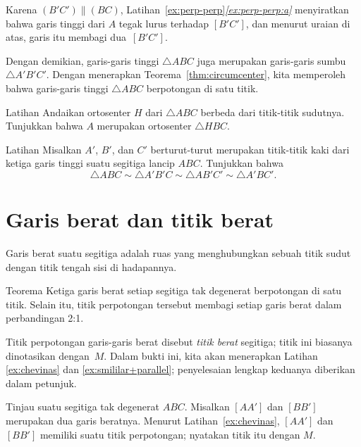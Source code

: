 Karena $(B' C')\parallel (BC)$, Latihan~\ref{ex:perp-perp}\textit{\ref{ex:perp-perp:a}} menyiratkan bahwa garis tinggi dari $A$ tegak lurus terhadap $[B' C']$, dan menurut uraian di atas, garis itu membagi dua~$[B' C']$.

Dengan demikian, garis-garis tinggi $\triangle A B C$
juga merupakan garis-garis sumbu $\triangle A' B' C'$.
Dengan menerapkan Teorema~\ref{thm:circumcenter}, kita memperoleh bahwa garis-garis tinggi $\triangle ABC$ berpotongan di satu titik.
\qeds

\begin{thm}{Latihan}\label{ex:orthic-4}
Andaikan ortosenter $H$ dari $\triangle ABC$ berbeda dari titik-titik sudutnya.
Tunjukkan bahwa $A$ merupakan ortosenter $\triangle H B C$.
\end{thm}

\begin{thm}{Latihan}\label{ex:orthic-sim}
Misalkan $A'$, $B'$, dan $C'$ berturut-turut merupakan titik-titik kaki dari ketiga garis tinggi suatu segitiga lancip $ABC$.
Tunjukkan bahwa
\[
\triangle ABC \sim \triangle A'B'C \sim \triangle AB'C' \sim \triangle A'BC'.
\]
\end{thm}



\section{Garis berat dan titik berat}

Garis berat suatu segitiga adalah ruas yang menghubungkan sebuah titik sudut dengan titik tengah sisi di hadapannya.

\begin{thm}{Teorema}\label{thm:centroid}
Ketiga garis berat setiap segitiga tak degenerat berpotongan di satu titik.
Selain itu, titik perpotongan tersebut membagi setiap garis berat dalam perbandingan 2:1.
\end{thm}

Titik perpotongan garis-garis berat disebut \emph{titik berat} segitiga;
titik ini biasanya dinotasikan dengan~$M$.
Dalam bukti ini, kita akan menerapkan Latihan \ref{ex:chevinas} dan \ref{ex:smililar+parallel}; penyelesaian lengkap keduanya diberikan dalam petunjuk.

Tinjau suatu segitiga tak degenerat $A B C$.
Misalkan $[A A']$ dan $[B B']$ merupakan dua garis beratnya.
Menurut Latihan~\ref{ex:chevinas},
$[A A']$ dan $[B B']$ memiliki suatu titik perpotongan;
nyatakan titik itu dengan $M$.

